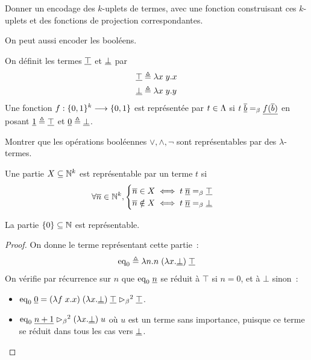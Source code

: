 \begin{exercise}
  Donner un encodage des $k$-uplets de termes, avec une fonction construisant
  ces $k$-uplets et des fonctions de projection correspondantes.
\end{exercise}

\noindent
On peut aussi encoder les booléens.

\begin{definition}
  On définit les termes $\underline{\top}$ et $\underline{\bot}$ par
  \begin{align*}
    \underline{\top} &\triangleq \lambda x\;y.x\\
    \underline{\bot} &\triangleq \lambda x\;y.y
  \end{align*}
  Une fonction $f : \displaystyle \{0,1\}^k \longrightarrow \{0,1\}$ est représentée par
  $t \in \Lambda$ si $t\;\underline{\overline{b}} =_{\beta} \underline{f(\overline{b})}$ en posant
  $\underline{1} \triangleq \underline{\top}$ et $\underline{0} \triangleq \underline{\bot}$.
\end{definition}

\begin{exercise}
  Montrer que les opérations booléennes $\lor,\land,\lnot$ sont
  représentables par des $\lambda$-termes.
\end{exercise}

\begin{definition}
  Une partie $X\subseteq \mathbb N^k$ est représentable par un terme $t$ si
  \[\forall \overline{n} \in \mathbb N^k, \begin{cases}
    \overline{n} \in X \iff t\;\underline{\overline{n}} =_{\beta} \underline{\top}\\
    \overline{n} \notin X \iff t \;\underline{\overline{n}} =_{\beta} \underline{\bot}
  \end{cases}\]
\end{definition}

\begin{proposition}
  La partie $\{0\}\subseteq \mathbb N$ est représentable.
\end{proposition}

\begin{proof}
  On donne le terme représentant cette partie~:
  \[\mathrm{eq}_0\triangleq \lambda n.n\;(\lambda x.\underline{\bot})\;\underline{\top}\]
  On vérifie par récurrence sur $n$ que $\mathrm{eq}_0\;\underline{n}$ se réduit à $\top$
  si $n = 0$, et à $\bot$ sinon~:
  \begin{itemize}
  \item
    $\mathrm{eq}_0\;\underline{0} = (\lambda f\;x.x)\;(\lambda x.\underline{\bot})\;
    \underline{\top}\mathrel{\rhd_{\beta}}^2\underline{\top}$.
  \item
    $\mathrm{eq}_0\;\underline{n+1} \mathrel{\rhd_{\beta}}^2 (\lambda x.\underline{\bot})\;u$ où $u$ est un
    terme sans importance, puisque ce terme se réduit dans tous les cas vers
    $\underline{\bot}$.
  \end{itemize}
\end{proof}

